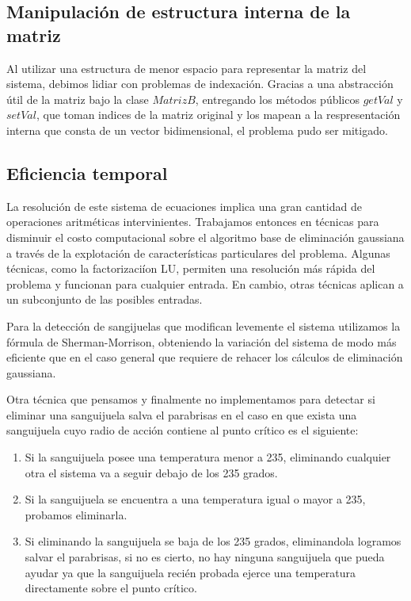 \VER
\subsection{Manipulaci\'on de estructura interna de la matriz}

Al utilizar una estructura de menor espacio para representar la matriz del sistema, debimos lidiar con problemas de indexaci\'on. Gracias a una abstracci\'on \'util de la matriz bajo la clase $MatrizB$, entregando los m\'etodos p\'ublicos $getVal$ y $setVal$, que toman indices de la matriz original y los mapean a la respresentaci\'on interna que consta de un vector bidimensional, el problema pudo ser mitigado.

\subsection{Eficiencia temporal}

La resoluci\'on de este sistema de ecuaciones implica una gran cantidad de operaciones aritm\'eticas intervinientes. Trabajamos entonces en t\'ecnicas para disminuir el costo computacional sobre el algoritmo base de eliminaci\'on gaussiana a trav\'es de la explotaci\'on de caracter\'isticas particulares del problema.
Algunas t\'ecnicas, como la factorizaci\'ion LU, permiten una resoluci\'on m\'as r\'apida del problema y funcionan para cualquier entrada. En cambio, otras t\'ecnicas aplican a un subconjunto de las posibles entradas.

Para la detecci\'on de sangijuelas que modifican levemente el sistema utilizamos la f\'ormula de Sherman-Morrison, obteniendo la variaci\'on del sistema de modo m\'as eficiente que en el caso general que requiere de rehacer los c\'alculos de eliminaci\'on gaussiana.

Otra t\'ecnica que pensamos y finalmente no implementamos para detectar si eliminar una sanguijuela salva el parabrisas en el caso en que exista una sanguijuela cuyo radio de acci\'on contiene al punto cr\'itico es el siguiente:

\begin{enumerate}
 \item Si la sanguijuela posee una temperatura menor a 235, eliminando cualquier otra el sistema va a seguir debajo de los 235 grados.
 \item Si la sanguijuela se encuentra a una temperatura igual o mayor a 235, probamos eliminarla.
 \item Si eliminando la sanguijuela se baja de los 235 grados, eliminandola logramos salvar el parabrisas, si no es cierto, no hay ninguna sanguijuela que pueda ayudar ya que la sanguijuela reci\'en probada ejerce una temperatura directamente sobre el punto cr\'itico.
\end{enumerate}
